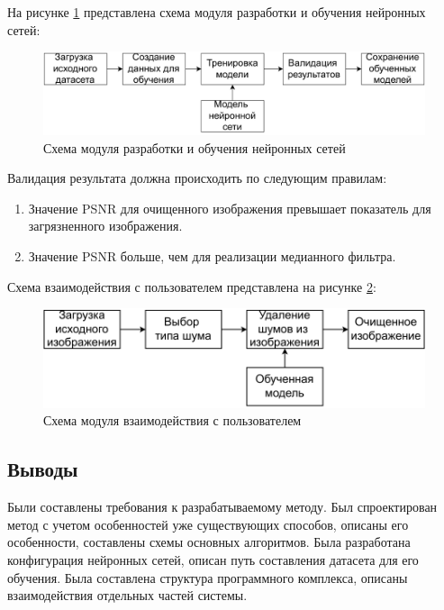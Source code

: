 На рисунке \ref{contruct::module1} представлена схема модуля разработки и обучения нейронных сетей:
\FloatBarrier
\begin{figure}[h]	
	\begin{center}
		\includegraphics[width=\linewidth]{inc/pdf/module1.pdf}
	\end{center}
	\captionsetup{justification=centering}
	\caption{Схема модуля разработки и обучения нейронных сетей}
	\label{contruct::module1}
\end{figure}
\FloatBarrier

Валидация результата должна происходить по следующим правилам:
\begin{enumerate}
	\item Значение PSNR для очищенного изображения превышает показатель для загрязненного изображения.
	\item Значение PSNR больше, чем для реализации медианного фильтра.
\end{enumerate}

\newpage
Схема взаимодействия с пользователем представлена на рисунке \ref{contruct::module2}:
\FloatBarrier
\begin{figure}[h]	
	\begin{center}
		\includegraphics[width=\linewidth]{inc/pdf/module2.pdf}
	\end{center}
	\captionsetup{justification=centering}
	\caption{Схема модуля взаимодействия с пользователем}
	\label{contruct::module2}
\end{figure}
\FloatBarrier

\subsection*{Выводы}
Были составлены требования к разрабатываемому методу.
Был спроектирован метод с учетом особенностей уже существующих способов, описаны его особенности, составлены схемы основных алгоритмов.
Была разработана конфигурация нейронных сетей, описан путь составления датасета для его обучения.
Была составлена структура программного комплекса, описаны взаимодействия отдельных частей системы.